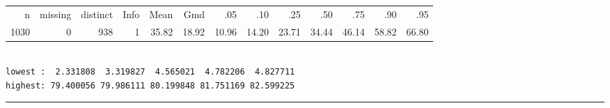 \begin{spacing}{0.7}
{{{\smaller
\begin{tabular}{ rrrrrrrrrrrrr }
n&missing&distinct&Info&Mean&Gmd&.05&.10&.25&.50&.75&.90&.95 \\
1030&0&938&1&35.82&18.92&10.96&14.20&23.71&34.44&46.14&58.82&66.80 \end{tabular}
\begin{verbatim}

lowest :  2.331808  3.319827  4.565021  4.782206  4.827711
highest: 79.400056 79.986111 80.199848 81.751169 82.599225
\end{verbatim}
}
\smallskip\hrule\smallskip
}
}\end{spacing}
